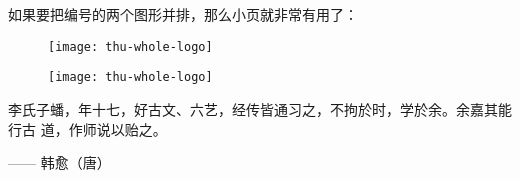 如果要把编号的两个图形并排，那么小页就非常有用了：
\begin{figure}
\begin{minipage}{0.48\textwidth}
  \centering
  \texttt{[image: thu-whole-logo]}
  \label{fig:parallel1}
\end{minipage}\hfill
\begin{minipage}{0.48\textwidth}
  \centering
  \texttt{[image: thu-whole-logo]}
  \label{fig:parallel2}
\end{minipage}
\end{figure}

李氏子蟠，年十七，好古文、六艺，经传皆通习之，不拘於时，学於余。余嘉其能行古
道，作师说以贻之。

\hfill —— 韩愈（唐）

